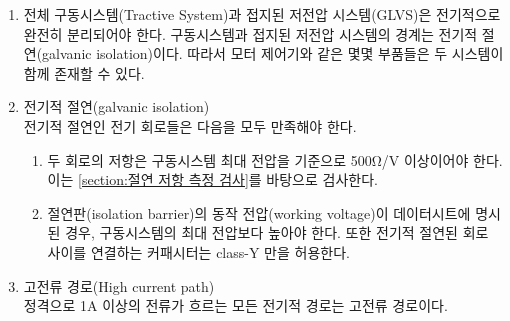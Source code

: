 \documentclass[final,a4paper,10pt]{report}
\begin{document}
\begin{enumerate}
  \item 전체 구동시스템(Tractive System)과 접지된 저전압 시스템(GLVS)은 전기적으로 완전히 분리되어야 한다. 구동시스템과 접지된 저전압 시스템의 경계는 전기적 절연(galvanic isolation)이다. 따라서 모터 제어기와 같은 몇몇 부품들은 두 시스템이 함께 존재할 수 있다.
  
  \item 전기적 절연(galvanic isolation)\\
    전기적 절연인 전기 회로들은 다음을 모두 만족해야 한다.
    \begin{enumerate}
      \item 두 회로의 저항은 구동시스템 최대 전압을 기준으로 500Ω/V 이상이어야 한다. 이는 \cref{section:절연 저항 측정 검사}를 바탕으로 검사한다.
      \item 절연판(isolation barrier)의 동작 전압(working voltage)이 데이터시트에 명시된 경우, 구동시스템의 최대 전압보다 높아야 한다. 또한 전기적 절연된 회로 사이를 연결하는 커패시터는 class-Y 만을 허용한다.
    \end{enumerate}
    
  \item 고전류 경로(High current path)\\ \label{item:고전류 경로}
    정격으로 1A 이상의 전류가 흐르는 모든 전기적 경로는 고전류 경로이다.
\end{enumerate}
\end{document}
